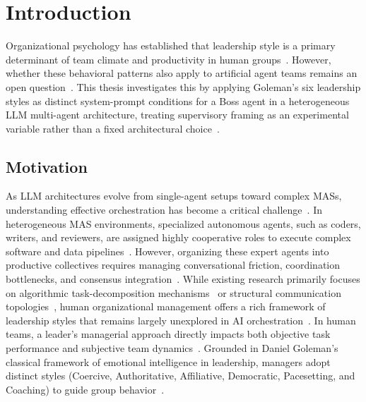 \chapter{Introduction}
\label{chap:introduction}

Organizational psychology has established that leadership style is a primary determinant of team climate and productivity in human groups~\cite{mathieu2017teamwork, goleman2000leadership}.
However, whether these behavioral patterns also apply to artificial agent teams remains an open question~\cite{muralidharan2025lessonshumanteamsapplied, kwak2026leadershipcoordinationcontrolbehavioral}.
This thesis investigates this by applying Goleman's six leadership styles as distinct system-prompt conditions for a Boss agent in a heterogeneous \ac{LLM} multi-agent architecture, treating supervisory framing as an experimental variable rather than a fixed architectural choice~\cite{guo2024embodiedllmagentslearn, faulkner2026evaluatingcooperationllmsocial}.

\section{Motivation}
\label{sec:motivation}

As \ac{LLM} architectures evolve from single-agent setups toward complex \acp{MAS}, understanding effective orchestration has become a critical challenge~\cite{guo2024largelanguagemodelbased, wang2026multiagentsystemsclassicalparadigms}. 
In heterogeneous \ac{MAS} environments, specialized autonomous agents, such as coders, writers, and reviewers, are assigned highly cooperative roles to execute complex software and data pipelines~\cite{qian2024chatdevcommunicativeagentssoftware, hong2024metagptmetaprogrammingmultiagent}.
However, organizing these expert agents into productive collectives requires managing conversational friction, coordination bottlenecks, and consensus integration~\cite{wu2023autogenenablingnextgenllm, muralidharan2025lessonshumanteamsapplied}.
While existing research primarily focuses on algorithmic task-decomposition mechanisms~\cite{liu2025selectthendecomposeempiricalanalysisadaptive} or structural communication topologies~\cite{chen2023agentversefacilitatingmultiagentcollaboration}, 
human organizational management offers a rich framework of leadership styles that remains largely unexplored in AI orchestration~\cite{mathieu2017teamwork, barrick1998personalityteamwork}. 
In human teams, a leader's managerial approach directly impacts both objective task performance and subjective team dynamics~\cite{mathieu2017teamwork, ayman1995contingency, goleman2000leadership}. 
Grounded in Daniel Goleman's classical framework of emotional intelligence in leadership, managers adopt distinct styles (Coercive, Authoritative, Affiliative, Democratic, Pacesetting, and Coaching) to guide group behavior~\cite{goleman2000leadership}.

